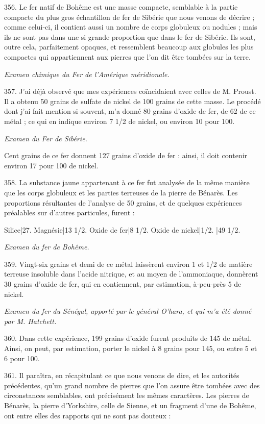 \documentclass[a4paper, 11pt, oneside, polutonikogreek, french]{article}
\begin{document}
356. Le fer natif de Bohême est une masse compacte, semblable à la partie compacte du plus gros échantillon de fer de Sibérie que nous venons de décrire ; comme celui-ci, il contient aussi un nombre de corps globuleux ou nodules ; mais ils ne sont pas dans une si grande proportion que dans le fer de Sibérie. Ils sont, outre cela, parfaitement opaques, et ressemblent beaucoup aux globules les plus compactes qui appartiennent aux pierres que l'on dit être tombées sur la terre.

\emph{Examen chimique du Fer de l'Amérique méridionale.}

357. J'ai déjà observé que mes expériences coïncidaient avec celles de M. Proust. Il a obtenu 50 grains de sulfate de nickel de 100 grains de cette masse. Le procédé dont j'ai fait mention si souvent, m'a donné 80 grains d'oxide de fer, de 62 de ce métal ; ce qui en indique environ 7 1/2 de nickel, ou environ 10 pour 100.

\emph{Examen du Fer de Sibérie.}

Cent grains de ce fer donnent 127 grains d'oxide de fer : ainsi, il doit contenir environ 17 pour 100 de nickel.

358. La substance jaune appartenant à ce fer fut analysée de la même manière que les corps globuleux et les parties terreuses de la pierre de Bénarès. Les proportions résultantes de l'analyse de 50 grains, et de quelques expériences préalables sur d'autres particules, furent :

Silice|27.
Magnésie|13 1/2.
Oxide de fer|8 1/2.
Oxide de nickel|1/2.
|49 1/2.

\emph{Examen du fer de Bohême.}

359. Vingt-six grains et demi de ce métal laissèrent environ 1 et 1/2 de matière terreuse insoluble dans l'acide nitrique, et au moyen de l'ammoniaque, donnèrent 30 grains d'oxide de fer, qui en contiennent, par estimation, à-peu-près 5 de nickel.

\emph{Examen du fer du Sénégal, apporté par le général O'hara, et qui m'a été donné par M. Hatchett.}

360. Dans cette expérience, 199 grains d'oxide furent produits de 145 de métal. Ainsi, on peut, par estimation, porter le nickel à 8 grains pour 145, ou entre 5 et 6 pour 100.

361. Il paraîtra, en récapitulant ce que nous venons de dire, et les autorités précédentes, qu'un grand nombre de pierres que l'on assure être tombées avec des circonstances semblables, ont précisément les mêmes caractères. Les pierres de Bénarès, la pierre d'Yorkshire, celle de Sienne, et un fragment d'une de Bohême, ont entre elles des rapports qui ne sont pas douteux :
\end{document}
